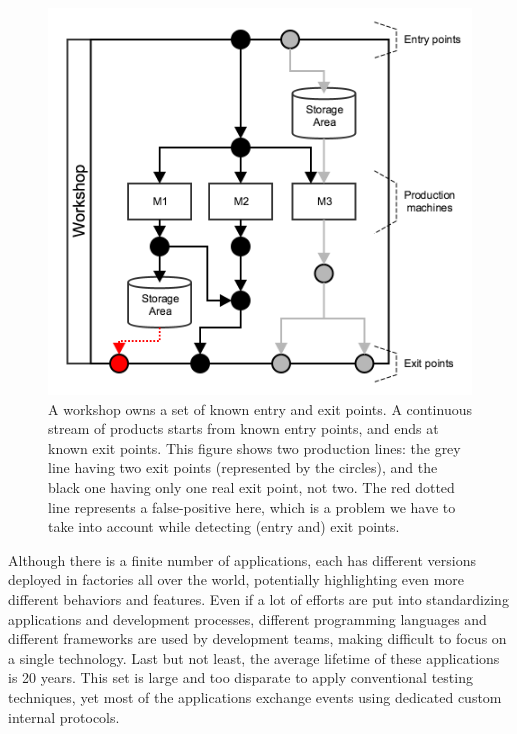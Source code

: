 \begin{figure}[ht]
    \begin{center}
        \includegraphics[width=1.0\linewidth]{figures/workshop-annotated.png}
    \end{center}

    \caption{A workshop owns a set of known entry and exit
    points. A continuous stream of products starts from known
    entry points, and ends at known exit points. This figure
    shows two production lines: the grey line having two exit
    points (represented by the circles), and the black one having
    only one real exit point, not two. The red dotted line
    represents a false-positive here, which is a problem we have
    to take into account while detecting (entry and) exit
    points.}
    \label{fig:workshop-annotated}
\end{figure}

Although there is a finite number of applications, each has
different versions deployed in factories all over the world,
potentially highlighting even more different behaviors and
features. Even if a lot of efforts are put into standardizing
applications and development processes, different programming
languages and different frameworks are used by development
teams, making difficult to focus on a single technology. Last
but not least, the average lifetime of these applications is 20
years. This set is large and too disparate to apply conventional
testing techniques, yet most of the applications exchange events
using dedicated custom internal protocols.


